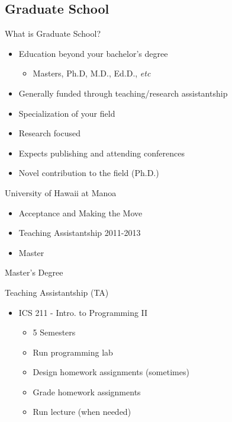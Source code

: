 \documentclass{beamer}
\begin{document}
\subsection{Graduate School}

\begin{frame}{What is Graduate School?}
\begin{itemize}
	\item Education beyond your bachelor's degree
	\begin{itemize}
		\item Masters, Ph.D, M.D., Ed.D., \emph{etc}
	\end{itemize}
	\item Generally funded through teaching/research assistantship
	\item Specialization of your field
	\item Research focused
	\item Expects publishing and attending conferences
	\item Novel contribution to the field (Ph.D.)
\end{itemize}
\end{frame}

\begin{frame}{University of Hawaii at Manoa}
\begin{itemize}
	\item Acceptance and Making the Move
	\item Teaching Assistantship 2011-2013
	\item Master
\end{itemize}
\end{frame}

\begin{frame}{Master's Degree}

\end{frame}

\begin{frame}{Teaching Assistantship (TA)}
\begin{itemize}
	\item ICS 211 - Intro. to Programming II
	\begin{itemize}
		\item 5 Semesters
		\item Run programming lab
		\item Design homework assignments (sometimes)
		\item Grade homework assignments
		\item Run lecture (when needed)
	\end{itemize}
\end{itemize}
\end{frame}
\end{document}
